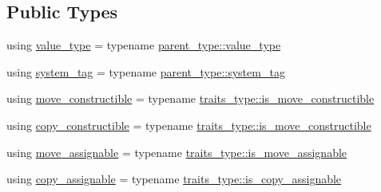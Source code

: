 \subsection*{Public Types}
\begin{DoxyCompactItemize}
\item 
using \hyperlink{classbc_1_1tensors_1_1Tensor__Base_ae7e5c0119f62f43ef74c5a463d3eaf13}{value\+\_\+type} = typename \hyperlink{classbc_1_1tensors_1_1Expression__Base_acda5b4e228c9b3cb9174258d5caf860a}{parent\+\_\+type\+::value\+\_\+type}
\item 
using \hyperlink{classbc_1_1tensors_1_1Tensor__Base_aef100d466be9075c6682ae9a2d2bd66d}{system\+\_\+tag} = typename \hyperlink{classbc_1_1tensors_1_1Expression__Base_a7c54328db22f61f881e7607b5a69b8e5}{parent\+\_\+type\+::system\+\_\+tag}
\item 
using \hyperlink{classbc_1_1tensors_1_1Tensor__Base_a705cd4c3c18056c0633bd5dd7a2b6691}{move\+\_\+constructible} = typename \hyperlink{structbc_1_1tensors_1_1exprs_1_1expression__traits_a79f84851dcb50d4b56daa25301a3f9fb}{traits\+\_\+type\+::is\+\_\+move\+\_\+constructible}
\item 
using \hyperlink{classbc_1_1tensors_1_1Tensor__Base_a08d8e4ba8980b44e1a3cf169a9c014b4}{copy\+\_\+constructible} = typename \hyperlink{structbc_1_1tensors_1_1exprs_1_1expression__traits_a79f84851dcb50d4b56daa25301a3f9fb}{traits\+\_\+type\+::is\+\_\+move\+\_\+constructible}
\item 
using \hyperlink{classbc_1_1tensors_1_1Tensor__Base_ac337cf3053ee0fde4b954d99496598f2}{move\+\_\+assignable} = typename \hyperlink{structbc_1_1tensors_1_1exprs_1_1expression__traits_ae32e2d333f9a7eed4baee44455cf7b46}{traits\+\_\+type\+::is\+\_\+move\+\_\+assignable}
\item 
using \hyperlink{classbc_1_1tensors_1_1Tensor__Base_ac2f69c5c3442940a65231923d6063544}{copy\+\_\+assignable} = typename \hyperlink{structbc_1_1tensors_1_1exprs_1_1expression__traits_ae5b90ffbe5ee242543685ac0905d8aec}{traits\+\_\+type\+::is\+\_\+copy\+\_\+assignable}
\end{DoxyCompactItemize}
